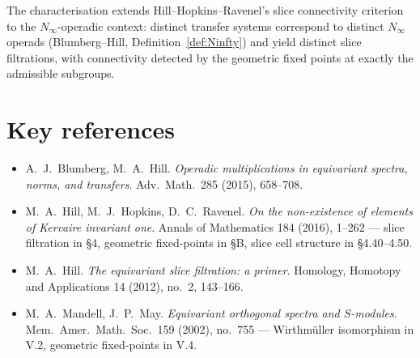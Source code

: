 \documentclass[12pt]{article}
\theoremstyle{definition}
\begin{document}
The characterisation extends Hill--Hopkins--Ravenel's slice connectivity
criterion to the $N_{\infty}$-operadic context: distinct transfer systems
correspond to distinct $N_{\infty}$ operads (Blumberg--Hill,
Definition~\ref{def:Ninfty}) and yield distinct slice filtrations, with
connectivity detected by the geometric fixed points at exactly the
admissible subgroups.

\appendix
\section*{Key references}

\begin{itemize}
\item A.\ J.\ Blumberg, M.\ A.\ Hill. \emph{Operadic multiplications in
equivariant spectra, norms, and transfers}. Adv.\ Math.\ 285 (2015), 658--708.
\item M.\ A.\ Hill, M.\ J.\ Hopkins, D.\ C.\ Ravenel. \emph{On the
non-existence of elements of Kervaire invariant one}. Annals of Mathematics
184 (2016), 1--262 — slice filtration in §4, geometric fixed-points in §B,
slice cell structure in §4.40--4.50.
\item M.\ A.\ Hill. \emph{The equivariant slice filtration: a primer}.
Homology, Homotopy and Applications 14 (2012), no.\ 2, 143--166.
\item M.\ A.\ Mandell, J.\ P.\ May. \emph{Equivariant orthogonal spectra and
$S$-modules}. Mem.\ Amer.\ Math.\ Soc.\ 159 (2002), no.\ 755 — Wirthmüller
isomorphism in V.2, geometric fixed-points in V.4.
\end{itemize}
\end{document}
